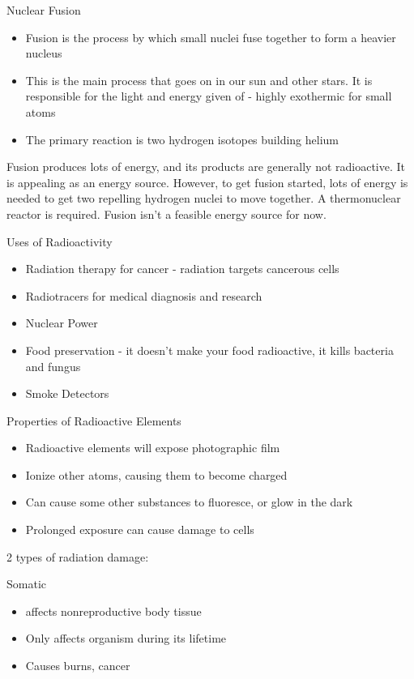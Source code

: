\documentclass[../hchem.tex]{subfiles}
\begin{document}
Nuclear Fusion 
\begin{itemize}
    \item Fusion is the process by which small nuclei fuse together to form a heavier nucleus 
    \item This is the main process that goes on in our sun and other stars. It is responsible for the light and energy given of - highly exothermic for small atoms 
    \item The primary reaction is two hydrogen isotopes building helium 
\end{itemize}

Fusion produces lots of energy, and its products are generally not radioactive. It is appealing as an energy source. However, to get fusion started, lots of energy is needed to get two repelling hydrogen nuclei to move together.
A thermonuclear reactor is required. Fusion isn't a feasible energy source for now.

Uses of Radioactivity 
\begin{itemize}
    \item Radiation therapy for cancer - radiation targets cancerous cells 
    \item Radiotracers for medical diagnosis and research 
    \item Nuclear Power 
    \item Food preservation - it doesn't make your food radioactive, it kills bacteria and fungus 
    \item Smoke Detectors 
\end{itemize}

Properties of Radioactive Elements 
\begin{itemize}
    \item Radioactive elements will expose photographic film 
    \item Ionize other atoms, causing them to become charged 
    \item Can cause some other substances to fluoresce, or glow in the dark 
    \item Prolonged exposure can cause damage to cells 
\end{itemize}

2 types of radiation damage:

Somatic 
\begin{itemize}
    \item affects nonreproductive body tissue 
    \item Only affects organism during its lifetime 
    \item Causes burns, cancer 
\end{itemize}
\end{document}
